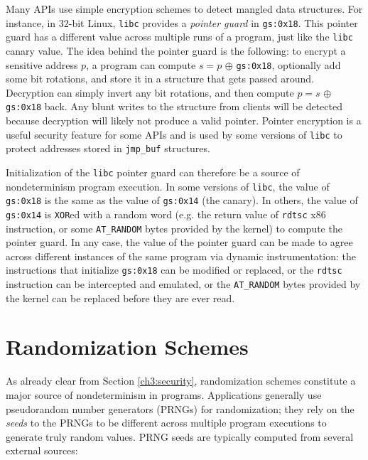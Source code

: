 Many APIs use simple encryption schemes to detect mangled data structures.
For instance, in 32-bit Linux, \texttt{libc} provides
a {\em pointer guard}  in \texttt{gs:0x18}. This pointer guard has a different value
across multiple runs of a program, just like the \texttt{libc} canary value.
The idea behind the pointer guard is the following: to encrypt a sensitive address $p$, a program
can compute $s = p$  $\oplus  $ \texttt{gs:0x18}, optionally add some bit rotations, and store it in a structure
that gets passed around. Decryption can simply invert any bit rotations, 
and then compute $p = s$ $\oplus  $ \texttt{gs:0x18} back. Any blunt writes to the structure from clients will be detected because 
decryption will likely not produce a valid pointer. 
Pointer encryption is a useful security feature for some APIs
and is used by some versions of \texttt{libc} to protect addresses stored in \texttt{jmp\_buf}
structures.

Initialization of the \texttt{libc} pointer guard can therefore be a source of nondeterminism
program execution. In some versions of \texttt{libc}, the value of \texttt{gs:0x18} is the same
as the value of \texttt{gs:0x14} (the canary). In others,
the value of \texttt{gs:0x14} is \texttt{XOR}ed with 
a random word (e.g. the return value of \texttt{rdtsc} x86 instruction,
or some \texttt{AT\_RANDOM} bytes provided by the kernel) to compute
the pointer guard. In any case, the value of the pointer
guard can be made to agree across different instances
of the same program via dynamic instrumentation: 
the instructions that initialize \texttt{gs:0x18} can
be modified or replaced, or the \texttt{rdtsc} instruction
can be intercepted and emulated, or the  \texttt{AT\_RANDOM} bytes provided by the kernel can be
replaced before they are ever read.

\section{Randomization Schemes} \label{ch3:rand}
As already clear from Section \ref{ch3:security}, 
randomization schemes constitute a major source of nondeterminism 
in programs.
Applications generally use pseudorandom number generators (PRNGs)
for randomization; they rely on the {\em seeds} to the PRNGs
to be different across multiple program executions 
to generate truly random values. PRNG seeds are typically 
computed from several external sources:

